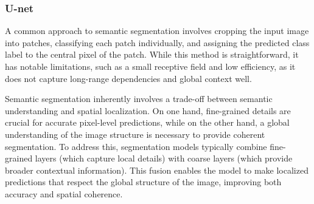 \subsubsection{U-net}
A common approach to semantic segmentation involves cropping the input image into patches, classifying each patch individually, and assigning the predicted class label to the central pixel of the patch. 
While this method is straightforward, it has notable limitations, such as a small receptive field and low efficiency, as it does not capture long-range dependencies and global context well.

Semantic segmentation inherently involves a trade-off between semantic understanding and spatial localization. 
On one hand, fine-grained details are crucial for accurate pixel-level predictions, while on the other hand, a global understanding of the image structure is necessary to provide coherent segmentation. 
To address this, segmentation models typically combine fine-grained layers (which capture local details) with coarse layers (which provide broader contextual information). 
This fusion enables the model to make localized predictions that respect the global structure of the image, improving both accuracy and spatial coherence.

